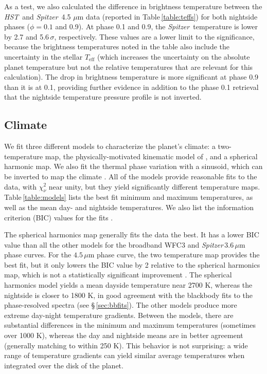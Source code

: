 \documentclass[twocolumn, trackchanges]{aastex61}
\newcommand{\project}[1]{\textsl{#1}}
\newcommand{\HST}{\project{HST}}
\newcommand{\Spitzer}{\project{Spitzer}}
\begin{document}
As a test, we also calculated the difference in brightness temperature
between the \HST\ and \Spitzer\ 4.5 $\mu$m data (reported in
Table\,\ref{table:teffs}) for both nightside phases ($\phi = 0.1$ and 0.9). At
phase 0.1 and 0.9, the \Spitzer\ temperature is lower by 2.7 and 5.6\,$\sigma$,
respectively.  These values are a lower limit to the significance, because the
brightness temperatures noted in the table also include the uncertainty in the
stellar $T_\mathrm{eff}$ (which increases the uncertainty on the absolute planet
temperature but not the relative temperatures that are relevant for this
calculation). The drop in brightness temperature is more significant at phase 0.9 than it is at 0.1, providing further evidence in addition to the phase 0.1 retrieval that the nightside temperature pressure profile is not inverted.


\subsection{Climate}
We fit three different models to characterize the planet's climate: a two-temperature map, the physically-motivated kinematic model of \cite{zhang17}, and a spherical harmonic map. We also fit the thermal phase variation with a sinusoid, which can be inverted to map the climate \citep{cowan08, cowan17}.  All of the models provide reasonable fits to the data, with $\chi^2_\nu$ near unity, but they yield significantly different temperature maps. Table\,\ref{table:models} lists the best fit minimum and maximum temperatures, as well as the mean day- and nightside temperatures. We also list the  information criterion (BIC) values for the fits \citep[a $\Delta$BIC value greater than 10 constitutes strong evidence against a given model;][]{kass95}.

The spherical harmonics map generally fits the data the best. It has a lower BIC value than all the other models for the broadband WFC3 and \Spitzer\,$3.6\,\mu$m phase curves. For the $4.5\,\mu$m phase curve, the two temperature map provides the best fit, but it only lowers the BIC value by 2 relative to the spherical harmonics map, which is not a statistically significant improvement \citep{kass95}.  The spherical harmonics model yields a mean dayside temperature near 2700 K, whereas the nightside is closer to 1800 K, in good agreement with the blackbody fits to the phase-resolved spectra (see \S\,\ref{sec:bbfits}).  The other models produce more extreme day-night temperature gradients.  Between the models, there are substantial differences in the minimum and maximum temperatures (sometimes over 1000 K), whereas the day and nightside means are in better agreement (generally matching to within 250 K). This behavior is not surprising: a wide range of temperature gradients can yield similar average temperatures when integrated over the disk of the planet.  
\end{document}
